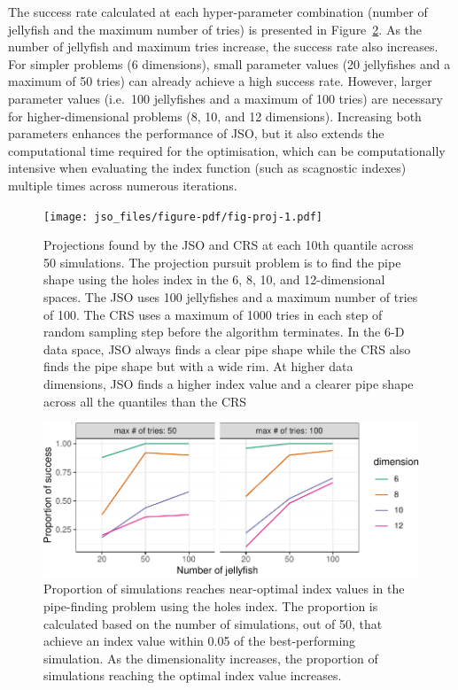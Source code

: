 \documentclass[
  12pt,
]{interact}
\theoremstyle{plain}
\begin{document}
The success rate calculated at each hyper-parameter combination (number
of jellyfish and the maximum number of tries) is presented in
Figure~\ref{fig-proportion}. As the number of jellyfish and maximum
tries increase, the success rate also increases. For simpler problems (6
dimensions), small parameter values (20 jellyfishes and a maximum of 50
tries) can already achieve a high success rate. However, larger
parameter values (i.e.~100 jellyfishes and a maximum of 100 tries) are
necessary for higher-dimensional problems (8, 10, and 12 dimensions).
Increasing both parameters enhances the performance of JSO, but it also
extends the computational time required for the optimisation, which can
be computationally intensive when evaluating the index function (such as
scagnostic indexes) multiple times across numerous iterations.

\begin{figure}

{\centering \texttt{[image: jso\_files/figure-pdf/fig-proj-1.pdf]}

}

\caption{\label{fig-proj}Projections found by the JSO and CRS at each
10th quantile across 50 simulations. The projection pursuit problem is
to find the pipe shape using the holes index in the 6, 8, 10, and
12-dimensional spaces. The JSO uses 100 jellyfishes and a maximum number
of tries of 100. The CRS uses a maximum of 1000 tries in each step of
random sampling step before the algorithm terminates. In the 6-D data
space, JSO always finds a clear pipe shape while the CRS also finds the
pipe shape but with a wide rim. At higher data dimensions, JSO finds a
higher index value and a clearer pipe shape across all the quantiles
than the CRS}

\end{figure}

\begin{figure}

{\centering \includegraphics{jso_files/figure-pdf/fig-proportion-1.pdf}

}

\caption{\label{fig-proportion}Proportion of simulations reaches
near-optimal index values in the pipe-finding problem using the holes
index. The proportion is calculated based on the number of simulations,
out of 50, that achieve an index value within 0.05 of the
best-performing simulation. As the dimensionality increases, the
proportion of simulations reaching the optimal index value increases.}

\end{figure}
\end{document}
